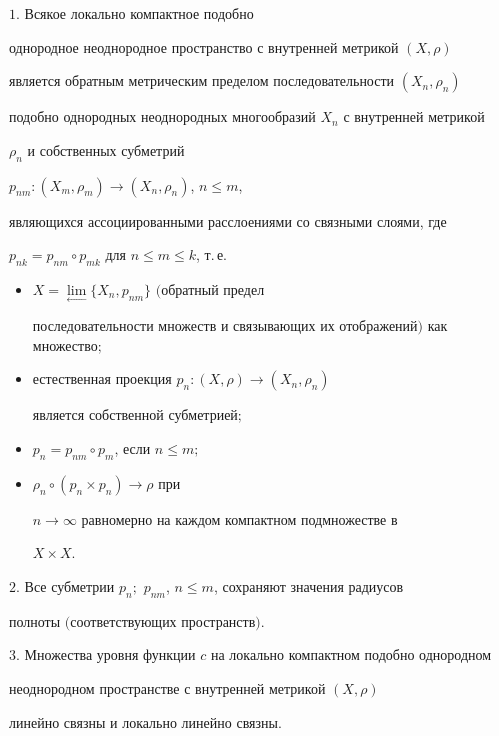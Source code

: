 \begin{thms}


\label{lim}


$1.$ Всякое локально компактное подобно


однородное неоднородное пространство с внутренней метрикой $(X,\rho)$


является обратным метрическим пределом последовательности $(X_{n},\rho_{n})$


подобно однородных неоднородных многообразий $X_{n}$ с внутренней метрикой


$\rho_{n}$ и собственных субметрий


$p_{nm}: (X_{m},\rho_{m}) \rightarrow (X_{n},\rho_{n})$, $n \leq m$,


являющихся ассоциированными расслоениями со связными слоями, где


$p_{nk}=p_{nm}\circ{p_{mk}}$ для $n \leq m \leq k$, т.\,е.


\begin{itemize}


\item[а)] $X= \lim\limits_{\leftarrow}\{X_{n},p_{nm}\}$ $($обратный предел


последовательности множеств и связывающих их отображений$)$ как множество$;$


\item[б)] естественная проекция $p_{n}: (X,\rho)\rightarrow (X_{n},\rho_{n})$


является собственной субметрией$;$


\item[в)] $p_{n}=p_{nm}\circ{p_{m}}$, если $n \leq m;$


\item[г)] $\rho_{n}\circ{(p_{n}\times p_{n})} \rightarrow \rho$ при


$n \rightarrow \infty$ равномерно на каждом компактном подмножестве в


$X \times X$.


\end{itemize}





$2.$ Все субметрии $p_{n};$ $p_{nm}$, $n \leq m$, сохраняют значения радиусов


полноты $($соответствующих пространств$)$.





$3.$ Множества уровня функции $c$ на локально компактном подобно однородном


неоднородном пространстве с внутренней метрикой $(X,\rho)$


линейно связны и локально линейно связны.


\end{thms}





